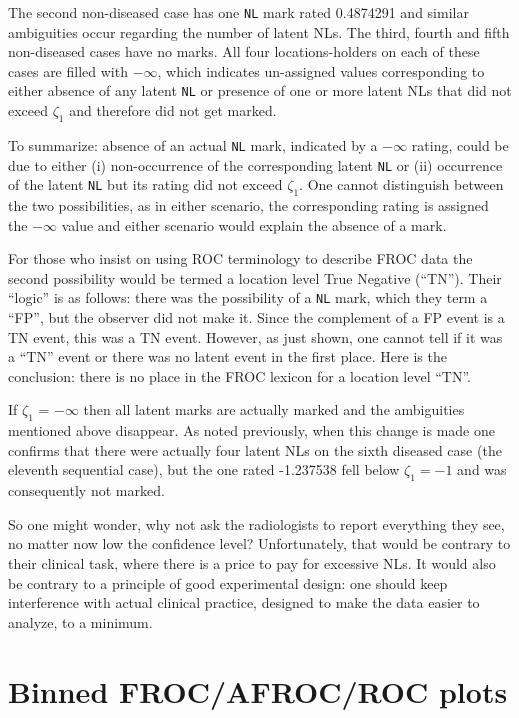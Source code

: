 \documentclass[
]{book}
\begin{document}
The second non-diseased case has one \texttt{NL} mark rated 0.4874291 and similar ambiguities occur regarding the number of latent NLs. The third, fourth and fifth non-diseased cases have no marks. All four locations-holders on each of these cases are filled with \(-\infty\), which indicates un-assigned values corresponding to either absence of any latent \texttt{NL} or presence of one or more latent NLs that did not exceed \(\zeta_1\) and therefore did not get marked.

To summarize: absence of an actual \texttt{NL} mark, indicated by a \(-\infty\) rating, could be due to either (i) non-occurrence of the corresponding latent \texttt{NL} or (ii) occurrence of the latent \texttt{NL} but its rating did not exceed \(\zeta_1\). One cannot distinguish between the two possibilities, as in either scenario, the corresponding rating is assigned the \(-\infty\) value and either scenario would explain the absence of a mark.

For those who insist on using ROC terminology to describe FROC data the second possibility would be termed a location level True Negative (``TN''). Their ``logic'' is as follows: there was the possibility of a \texttt{NL} mark, which they term a ``FP'', but the observer did not make it. Since the complement of a FP event is a TN event, this was a TN event. However, as just shown, one cannot tell if it was a ``TN'' event or there was no latent event in the first place. Here is the conclusion: there is no place in the FROC lexicon for a location level ``TN''.

If \(\zeta_1\) = \(-\infty\) then all latent marks are actually marked and the ambiguities mentioned above disappear. As noted previously, when this change is made one confirms that there were actually four latent NLs on the sixth diseased case (the eleventh sequential case), but the one rated -1.237538 fell below \(\zeta_1 = -1\) and was consequently not marked.

So one might wonder, why not ask the radiologists to report everything they see, no matter now low the confidence level? Unfortunately, that would be contrary to their clinical task, where there is a price to pay for excessive NLs. It would also be contrary to a principle of good experimental design: one should keep interference with actual clinical practice, designed to make the data easier to analyze, to a minimum.

\hypertarget{binned-frocafrocroc-plots}{%
\section{Binned FROC/AFROC/ROC plots}\label{binned-frocafrocroc-plots}}
\end{document}
